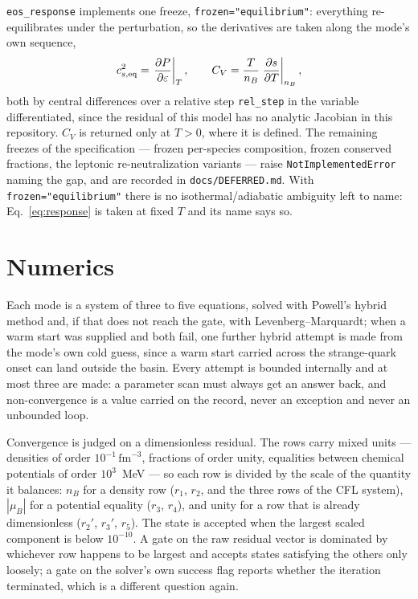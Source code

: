 \documentclass[aps,prc,onecolumn,superscriptaddress,nofootinbib,10pt]{revtex4-2}
\newcommand{\nB}{n_B}
\newcommand{\muB}{\mu_B}
\begin{document}
\texttt{eos\_response} implements one freeze,
\texttt{frozen="equilibrium"}: everything re-equilibrates under the
perturbation, so the derivatives are taken along the mode's own sequence,
%
\begin{equation}
c_{s,\rm eq}^2 = \left. \frac{\partial P}{\partial \varepsilon} \right|_{T} ,
\qquad
C_V = \frac{T}{\nB} \left. \frac{\partial s}{\partial T} \right|_{\nB} ,
\label{eq:response}
\end{equation}
%
both by central differences over a relative step \texttt{rel\_step} in the
variable differentiated, since the residual of this model has no analytic
Jacobian in this repository. $C_V$ is returned only at $T > 0$, where it is
defined. The remaining freezes of the specification --- frozen per-species
composition, frozen conserved fractions, the leptonic re-neutralization
variants --- raise \texttt{NotImplementedError} naming the gap, and are
recorded in \texttt{docs/DEFERRED.md}. With
\texttt{frozen="equilibrium"} there is no isothermal/adiabatic ambiguity left
to name: Eq.~\eqref{eq:response} is taken at fixed $T$ and its name says so.

\section{Numerics}
\label{sec:numerics}

Each mode is a system of three to five equations, solved with Powell's hybrid
method and, if that does not reach the gate, with Levenberg--Marquardt; when a
warm start was supplied and both fail, one further hybrid attempt is made from
the mode's own cold guess, since a warm start carried across the strange-quark
onset can land outside the basin. Every attempt is bounded internally and at
most three are made: a parameter scan must always get an answer back, and
non-convergence is a value carried on the record, never an exception and never
an unbounded loop.

Convergence is judged on a dimensionless residual. The rows carry mixed units
--- densities of order $10^{-1}\,\mathrm{fm}^{-3}$, fractions of order unity,
equalities between chemical potentials of order $10^{3}$~MeV --- so each row
is divided by the scale of the quantity it balances: $\nB$ for a density row
($r_1$, $r_2$, and the three rows of the CFL system), $|\muB|$ for a potential
equality ($r_3$, $r_4$), and unity for a row that is already dimensionless
($r_2'$, $r_3'$, $r_5$). The state is accepted when the largest scaled
component is below $10^{-10}$. A gate on the raw residual vector is dominated
by whichever row happens to be largest and accepts states satisfying the
others only loosely; a gate on the solver's own success flag reports whether
the iteration terminated, which is a different question again.
\end{document}

